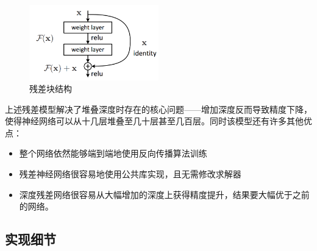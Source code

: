 \documentclass[10pt,a4paper,twoside]{article}
\numberwithin{figure}{section}%
\numberwithin{table}{section}%
\begin{document}
	\begin{figure}[H]
	    \centering
	    \includegraphics[width=0.5\textwidth]{figures/图片2.png}
	    \caption{残差块结构}
	    \label{fig:2}
	\end{figure}
上述残差模型解决了堆叠深度时存在的核心问题——增加深度反而导致精度下降，使得神经网络可以从十几层堆叠至几十层甚至几百层。同时该模型还有许多其他优点：
\begin{itemize}
\item 整个网络依然能够端到端地使用反向传播算法训练
\item 残差神经网络很容易地使用公共库实现，且无需修改求解器
\item 深度残差网络很容易从大幅增加的深度上获得精度提升，结果要大幅优于之前的网络。
\end{itemize}


\subsection{实现细节}
\end{document}
